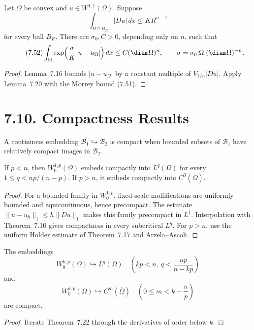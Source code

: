 \begin{theorem}
\label{gt:thm-sobolev-john-nirenberg}
Let $\Omega$ be convex and $u\in W^{1,1}(\Omega)$. Suppose
\begin{equation}
\tag{7.51}
\int_{\Omega\cap B_R}|Du|\,dx\leq KR^{n-1}
\end{equation}
for every ball $B_R$. There are $\sigma_0,C>0$, depending only on $n$, such
that
\begin{equation}
\tag{7.52}
\int_\Omega\exp\!\left(\frac\sigma K|u-u_\Omega|\right)dx
\leq C(\diam\Omega)^n,
\qquad
\sigma=\sigma_0|\Omega|(\diam\Omega)^{-n}.
\end{equation}
\end{theorem}
\begin{proof}
\sketch Lemma~7.16 bounds $|u-u_\Omega|$ by a constant multiple of
$V_{1/n}|Du|$. Apply Lemma~7.20 with the Morrey bound (7.51).
\end{proof}

\section*{7.10. Compactness Results}

A continuous embedding $\mathcal B_1\hookrightarrow\mathcal B_2$ is compact
when bounded subsets of $\mathcal B_1$ have relatively compact images in
$\mathcal B_2$.

\begin{theorem}
\label{gt:thm-sobolev-kondrachov}
If $p<n$, then $W_0^{1,p}(\Omega)$ embeds compactly into $L^q(\Omega)$ for
every $1\leq q<np/(n-p)$. If $p>n$, it embeds compactly into
$C^0(\overline\Omega)$.
\end{theorem}
\begin{proof}
\sketch For a bounded family in $W_0^{1,p}$, fixed-scale mollifications are
uniformly bounded and equicontinuous, hence precompact. The estimate
$\|u-u_h\|_1\leq h\|Du\|_1$ makes this family precompact in $L^1$.
Interpolation with Theorem~7.10 gives compactness in every subcritical
$L^q$. For $p>n$, use the uniform H\"older estimate of Theorem~7.17 and
Arzela--Ascoli.
\end{proof}

\begin{corollary}
\label{gt:cor-sobolev-kondrachov-higher-order}
The embeddings
\[
W_0^{k,p}(\Omega)\hookrightarrow L^q(\Omega)
\quad\left(kp<n,\ q<\frac{np}{n-kp}\right)
\]
and
\[
W_0^{k,p}(\Omega)\hookrightarrow C^m(\overline\Omega)
\quad\left(0\leq m<k-\frac np\right)
\]
are compact.
\end{corollary}
\begin{proof}
\sketch Iterate Theorem~7.22 through the derivatives of order below $k$.
\end{proof}


